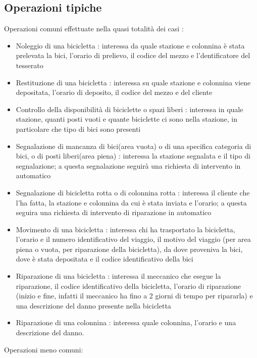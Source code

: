 \documentclass[a4paper,twoside]{article}
\begin{document}
\subsection{Operazioni tipiche}
Operazioni comuni effettuate nella quasi totalità dei casi :
\begin{itemize}
 \item Noleggio di una bicicletta : interessa da quale stazione e colonnina è stata prelevata la bici, l'orario di prelievo, il codice del mezzo e l'dentificatore del tesserato
 \item Restituzione di una bicicletta : interessa su quale stazione e colonnina viene depositata, l'orario di deposito, il codice del mezzo e del cliente
 \item Controllo della disponibilità di biciclette o spazi liberi : interessa in quale stazione, quanti posti vuoti e quante biciclette ci sono nella stazione, in particolare che tipo di bici sono presenti
 \item Segnalazione di mancanza di bici(area vuota) o di una specifica categoria di bici, o di posti liberi(area piena) : interessa la stazione segnalata e il tipo di segnalazione; a questa segnalazione seguirà una richiesta di intervento in automatico
 \item Segnalazione di bicicletta rotta o di colonnina rotta : interessa il cliente che l'ha fatta, la stazione e colonnina da cui è stata inviata e l'orario; a questa seguira una richiesta di intervento di riparazione in automatico
 \item Movimento di una bicicletta : interessa chi ha trasportato la bicicletta, l'orario e il numero identificativo del viaggio, il motivo del viaggio (per area piena o vuota, per riparazione della bicicletta), da dove proveniva la bici, dove è stata depositata e il codice identificativo della bici
 \item Riparazione di una bicicletta : interessa il meccanico che esegue la riparazione, il codice identificativo della bicicletta, l'orario di riparazione (inizio e fine, infatti il meccanico ha fino a 2 giorni di tempo per ripararla) e una descrizione del danno presente nella bicicletta
 \item Riparazione di una colonnina : interessa quale colonnina, l'orario e una descrizione del danno.
\end{itemize}
Operazioni meno comuni:
\end{document}

